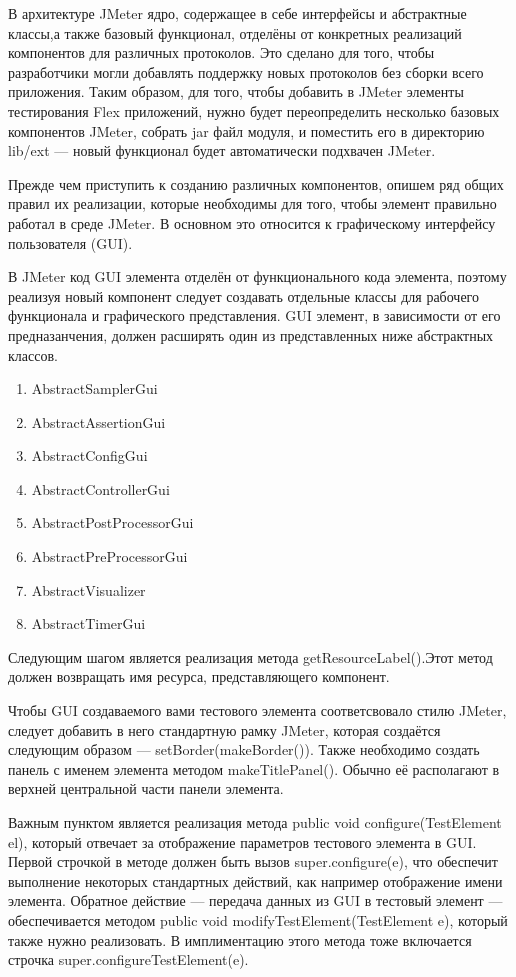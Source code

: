 В архитектуре JMeter ядро, содержащее в себе интерфейсы и абстрактные классы,а также базовый функционал,
отделёны от конкретных реализаций компонентов для различных протоколов. Это сделано для того, чтобы разработчики
могли добавлять поддержку новых протоколов без сборки всего приложения. Таким образом, для того, чтобы добавить
в JMeter элементы тестирования Flex приложений, нужно будет переопределить несколько базовых
компонентов JMeter, собрать jar файл модуля, и поместить его в директорию lib/ext --- новый функционал будет
автоматически подхвачен JMeter.

Прежде чем приступить к созданию различных компонентов, опишем ряд общих правил их реализации,
которые необходимы для того, чтобы элемент правильно работал в среде JMeter. В основном это относится к
графическому интерфейсу пользователя (GUI).

В JMeter код GUI элемента отделён от функционального кода элемента, поэтому реализуя новый компонент следует
создавать отдельные классы для рабочего функционала и графического представления. GUI элемент, в зависимости
 от его предназанчения, должен расширять один из представленных ниже абстрактных классов.

\begin{enumerate}
\item AbstractSamplerGui
\item AbstractAssertionGui
\item AbstractConfigGui
\item AbstractControllerGui
\item AbstractPostProcessorGui
\item AbstractPreProcessorGui
\item AbstractVisualizer
\item AbstractTimerGui
\end{enumerate}

Следующим шагом является реализация метода getResourceLabel().Этот метод должен возвращать имя ресурса,
представляющего компонент.

Чтобы GUI создаваемого вами тестового элемента соответсвовало стилю JMeter, следует добавить в него стандартную
рамку JMeter, которая создаётся следующим образом --- setBorder(makeBorder()). Также необходимо создать
панель с именем элемента методом makeTitlePanel(). Обычно её располагают в верхней центральной части панели
элемента.

Важным пунктом является реализация метода public void configure(TestElement el), который отвечает за отображение
параметров тестового элемента в GUI. Первой строчкой в методе должен быть вызов super.configure(e), что обеспечит
выполнение некоторых стандартных действий, как например отображение имени элемента. Обратное действие ---
передача данных из GUI в тестовый элемент --- обеспечивается методом public void modifyTestElement(TestElement e),
который также нужно реализовать. В имплиментацию этого метода тоже включается строчка
super.configureTestElement(e).

